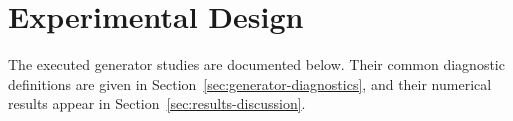 \section{Experimental Design}
\label{sec:experimental-design}

The executed generator studies are documented below. Their common diagnostic
definitions are given in Section~\ref{sec:generator-diagnostics}, and their
numerical results appear in Section~\ref{sec:results-discussion}.





%
%
%
%
%
